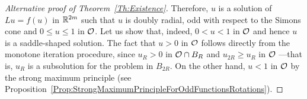 \begin{proof}[Alternative proof of Theorem~\ref{Th:Existence}]
Therefore, $u$ is a solution of $Lu = f(u)$ in $\mathbb{R}^{2m}$ such that $u$ is doubly radial, odd with respect to the Simons cone and $0\leq u \leq 1$ in $\mathcal{O}$. Let us show that, indeed, $0 < u < 1$ in $\mathcal{O}$ and hence $u$ is a saddle-shaped solution. The fact that $u>0$ in $\mathcal{O}$ follows directly from the monotone iteration procedure, since $u_{R} > 0$ in $\mathcal{O} \cap B_R$ and $u_{2R} \geq u_{R}$ in $\mathcal{O}$ ---that is, $u_{R}$ is a subsolution for the problem in $B_{2R}$. On the other hand, $u < 1$ in $\mathcal{O}$ by the strong maximum principle (see Proposition~\ref{Prop:StrongMaximumPrincipleForOddFunctionsRotations}).

\end{proof}

